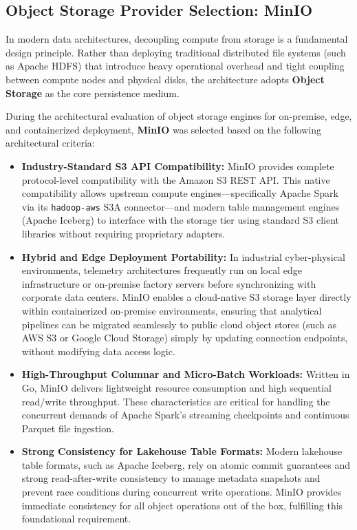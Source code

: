 \subsection{Object Storage Provider Selection: MinIO}
\label{subsec:minio-provider-selection}

In modern data architectures, decoupling compute from storage is a fundamental design principle.
Rather than deploying traditional distributed file systems (such as Apache HDFS) that introduce heavy operational overhead and tight coupling between compute nodes and physical disks, the architecture adopts \textbf{Object Storage} as the core persistence medium.

During the architectural evaluation of object storage engines for on-premise, edge, and containerized deployment, \textbf{MinIO} was selected based on the following architectural criteria:

\begin{itemize}
    \item \textbf{Industry-Standard S3 API Compatibility:} MinIO provides complete protocol-level compatibility with the Amazon S3 REST API.
    This native compatibility allows upstream compute engines—specifically Apache Spark via its \texttt{hadoop-aws} S3A connector—and modern table management engines (Apache Iceberg) to interface with the storage tier using standard S3 client libraries without requiring proprietary adapters.

    \item \textbf{Hybrid and Edge Deployment Portability:} In industrial cyber-physical environments, telemetry architectures frequently run on local edge infrastructure or on-premise factory servers before synchronizing with corporate data centers.
    MinIO enables a cloud-native S3 storage layer directly within containerized on-premise environments, ensuring that analytical pipelines can be migrated seamlessly to public cloud object stores (such as AWS S3 or Google Cloud Storage) simply by updating connection endpoints, without modifying data access logic.

    \item \textbf{High-Throughput Columnar and Micro-Batch Workloads:} Written in Go, MinIO delivers lightweight resource consumption and high sequential read/write throughput.
    These characteristics are critical for handling the concurrent demands of Apache Spark's streaming checkpoints and continuous Parquet file ingestion.

    \item \textbf{Strong Consistency for Lakehouse Table Formats:} Modern lakehouse table formats, such as Apache Iceberg, rely on atomic commit guarantees and strong read-after-write consistency to manage metadata snapshots and prevent race conditions during concurrent write operations.
    MinIO provides immediate consistency for all object operations out of the box, fulfilling this foundational requirement.
\end{itemize}

